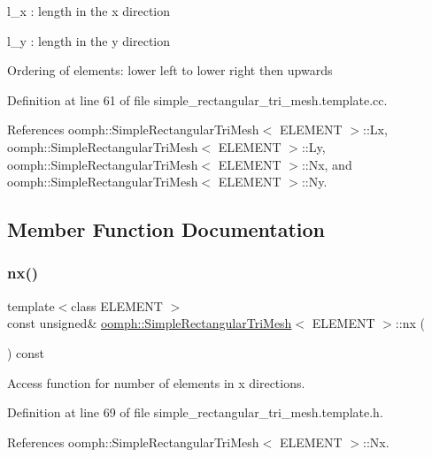 l\+\_\+x \+: length in the x direction

l\+\_\+y \+: length in the y direction

Ordering of elements\+: \textquotesingle{}lower left\textquotesingle{} to \textquotesingle{}lower right\textquotesingle{} then \textquotesingle{}upwards\textquotesingle{} 

Definition at line 61 of file simple\+\_\+rectangular\+\_\+tri\+\_\+mesh.\+template.\+cc.



References oomph\+::\+Simple\+Rectangular\+Tri\+Mesh$<$ E\+L\+E\+M\+E\+N\+T $>$\+::\+Lx, oomph\+::\+Simple\+Rectangular\+Tri\+Mesh$<$ E\+L\+E\+M\+E\+N\+T $>$\+::\+Ly, oomph\+::\+Simple\+Rectangular\+Tri\+Mesh$<$ E\+L\+E\+M\+E\+N\+T $>$\+::\+Nx, and oomph\+::\+Simple\+Rectangular\+Tri\+Mesh$<$ E\+L\+E\+M\+E\+N\+T $>$\+::\+Ny.



\subsection{Member Function Documentation}
\mbox{\label{classoomph_1_1SimpleRectangularTriMesh_ac8fcc898b00209b300684dd8addd9b4f}} 
\subsubsection{\texorpdfstring{nx()}{nx()}}
{\footnotesize\ttfamily template$<$class E\+L\+E\+M\+E\+NT $>$ \\
const unsigned\& \hyperlink{classoomph_1_1SimpleRectangularTriMesh}{oomph\+::\+Simple\+Rectangular\+Tri\+Mesh}$<$ E\+L\+E\+M\+E\+NT $>$\+::nx (\begin{DoxyParamCaption}{ }\end{DoxyParamCaption}) const\hspace{0.3cm}{\ttfamily [inline]}}



Access function for number of elements in x directions. 



Definition at line 69 of file simple\+\_\+rectangular\+\_\+tri\+\_\+mesh.\+template.\+h.



References oomph\+::\+Simple\+Rectangular\+Tri\+Mesh$<$ E\+L\+E\+M\+E\+N\+T $>$\+::\+Nx.

